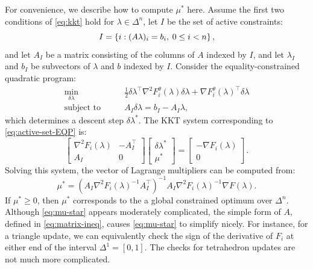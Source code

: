 \documentclass[eikonal.tex]{subfiles}
\begin{document}
For convenience, we describe how to compute $\mu^*$ here. Assume the
first two conditions of \cref{eq:kkt} hold for $\lambda \in \Delta^n$,
let $I$ be the set of active constraints:
\begin{equation}
  I = \left\{i : (A\lambda)_i = b_i, \hspace{0.25em} 0 \leq i < n\right\},
\end{equation}
and let $A_I$ be a matrix consisting of the columns of $A$ indexed by
$I$, and let $\lambda_I$ and $b_I$ be subvectors of $\lambda$ and $b$
indexed by $I$. Consider the equality-constrained quadratic program:
\begin{equation}
  \label{eq:active-set-EQP}
  \begin{split}
    \min_{\delta \lambda} &\qquad \frac{1}{2} \delta \lambda^\top \nabla^2 F_i^\theta (\lambda) \delta \lambda + \nabla F_i^\theta(\lambda)^\top \delta \lambda \\
    \text{subject to} &\qquad A_I \delta \lambda = b_I - A_I \lambda,
  \end{split}
\end{equation}
which determines a descent step $\delta \lambda^*$. The KKT system
corresponding to \cref{eq:active-set-EQP} is:
\begin{equation}
  \begin{bmatrix}
    \nabla^2 F_i (\lambda) & -A_I^\top \\
    A_I & 0
  \end{bmatrix} \begin{bmatrix}
    \delta\lambda^* \\ \mu^*
  \end{bmatrix} = \begin{bmatrix}
    -\nabla F_i(\lambda) \\ 0
  \end{bmatrix}.
\end{equation}
Solving this system, the vector of Lagrange multipliers can be
computed from:
\begin{equation}\label{eq:mu-star}
  \mu^* = {(A_I \nabla^2 F_i(\lambda)^{-1} A_I^\top)}^{-1} A_I \nabla^2 F_i(\lambda)^{-1} \nabla F(\lambda).
\end{equation}
If $\mu^* \geq 0$, then $\mu^*$ corresponds to the a global
constrained optimum over $\Delta^n$. Although \cref{eq:mu-star}
appears moderately complicated, the simple form of $A$, defined in
\cref{eq:matrix-ineq}, causes \cref{eq:mu-star} to simplify
nicely. For instance, for a triangle update, we can equivalently check
the sign of the derivative of $F_i$ at either end of the interval
$\Delta^1 = [0, 1]$. The checks for tetrahedron updates are not much
more complicated.
\end{document}
